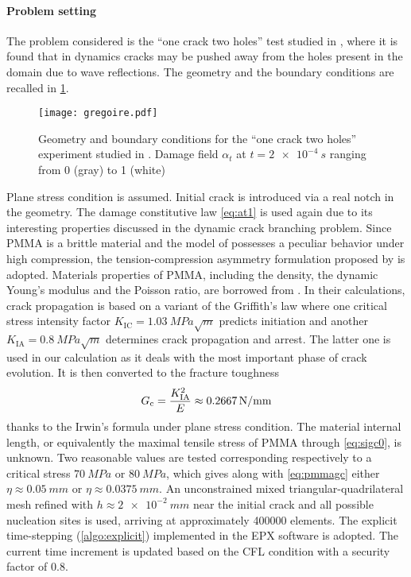 \paragraph{Problem setting} The problem considered is the ``one crack two holes'' test studied in \cite{HaboussaGregoireElguedjMaigreCombescure:2011}, where it is found that in dynamics cracks may be pushed away from the holes present in the domain due to wave reflections. The geometry and the boundary conditions are recalled in \cref{fig:gregoire}.
\begin{figure}[htbp]
\centering
\texttt{[image: gregoire.pdf]}
\caption{Geometry and boundary conditions for the ``one crack two holes'' experiment studied in \cite{HaboussaGregoireElguedjMaigreCombescure:2011}. Damage field $\alpha_t$ at $t=\SI{2e-4}{s}$ ranging from 0 (gray) to 1 (white)} \label{fig:gregoire}
\end{figure}
Plane stress condition is assumed. Initial crack is introduced via a real notch in the geometry. The damage constitutive law \eqref{eq:at1} is used again due to its interesting properties discussed in the dynamic crack branching problem. Since PMMA is a brittle material \cite{GregoireMaigreRethoreCombescure:2007} and the model of \cite{MieheHofackerWelschinger:2010} possesses a peculiar behavior under high compression, the tension-compression asymmetry formulation proposed by \cite{FreddiRoyer-Carfagni:2010} is adopted. Materials properties of PMMA, including the density, the dynamic Young's modulus and the Poisson ratio, are borrowed from \cite{HaboussaGregoireElguedjMaigreCombescure:2011}. In their calculations, crack propagation is based on a variant of the Griffith's law where one critical stress intensity factor $K_\mathrm{IC}=\SI{1.03}{MPa\sqrt{m}}$ predicts initiation and another $K_\mathrm{IA}=\SI{0.8}{MPa\sqrt{m}}$ determines crack propagation and arrest. The latter one is used in our calculation as it deals with the most important phase of crack evolution. It is then converted to the fracture toughness
\begin{equation} \label{eq:pmmagc}
G_\mathrm{c}=\frac{K_\mathrm{IA}^2}{E}\approx\SI{0.2667}{N/mm}
\end{equation}
thanks to the Irwin's formula under plane stress condition. The material internal length, or equivalently the maximal tensile stress of PMMA through \eqref{eq:sigc0}, is unknown. Two reasonable values are tested corresponding respectively to a critical stress $\SI{70}{MPa}$ or $\SI{80}{MPa}$, which gives along with \eqref{eq:pmmagc} either $\eta\approx\SI{0.05}{mm}$ or $\eta\approx\SI{0.0375}{mm}$. An unconstrained mixed triangular-quadrilateral mesh refined with $h\approx\SI{2e-2}{mm}$ near the initial crack and all possible nucleation sites is used, arriving at approximately \num{400000} elements. The explicit time-stepping (\cref{algo:explicit}) implemented in the EPX software is adopted. The current time increment is updated based on the CFL condition with a security factor of 0.8.

